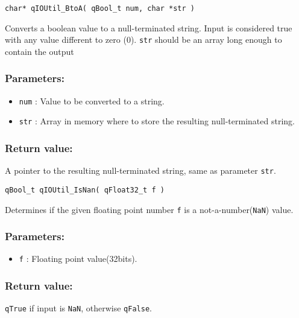 \noindent\hrulefill

\begin{lstlisting}[style=CStyle]
char* qIOUtil_BtoA( qBool_t num, char *str )
\end{lstlisting}

Converts a boolean value to a null-terminated string. Input is considered true
with any value different to zero (0). 
\lstinline{str} should be an array long enough to contain the output

\subsubsection*{Parameters:}
\begin{itemize}
    \item \lstinline{num} : Value to be converted to a string.
    \item \lstinline{str} : Array in memory where to store the resulting null-terminated string.
\end{itemize}

\subsubsection*{Return value:}
A pointer to the resulting null-terminated string, same as parameter \lstinline{str}.



\noindent\hrulefill

\begin{lstlisting}[style=CStyle]
qBool_t qIOUtil_IsNan( qFloat32_t f )
\end{lstlisting}

Determines if the given floating point number \lstinline{f} is a not-a-number(\lstinline{NaN}) value. 

\subsubsection*{Parameters:}
\begin{itemize}
    \item \lstinline{f} : Floating point value(32bits).
\end{itemize}

\subsubsection*{Return value:}
\lstinline{qTrue} if input is \lstinline{NaN}, otherwise \lstinline{qFalse}.


